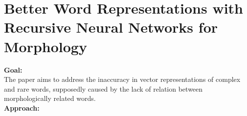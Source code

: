 \documentclass[11pt,a4paper]{article}
\begin{document}


\section{Better Word Representations with Recursive Neural Networks for Morphology} %
\label{sec:better_word_representations_with_recursive_neural_networks_for_morphology}

  \textbf{Goal:}\\
  The paper aims to address the inaccuracy in vector representations of complex and rare words, supposedly caused by the lack of relation between morphologically related words. \cite{luong2013better}\\

  \textbf{Approach:}
\end{document}
